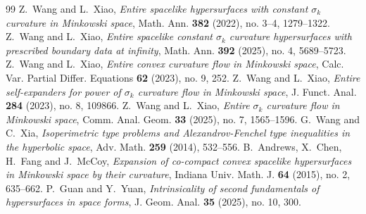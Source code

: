 \documentclass[10pt,a4paper]{amsart}
\numberwithin{equation}{section}
\begin{document}
\begin{thebibliography}{99}
 Z.~Wang and L.~Xiao, {\em Entire spacelike hypersurfaces with constant $\sigma_k$ curvature in Minkowski space}, Math. Ann. {\bf 382} (2022), no. 3--4, 1279--1322.
 Z.~Wang and L.~Xiao, {\em Entire spacelike constant $\sigma_k$ curvature hypersurfaces with prescribed boundary data at infinity}, Math. Ann. {\bf 392} (2025), no. 4, 5689--5723.
 Z.~Wang and L.~Xiao, {\em Entire convex curvature flow in Minkowski space}, Calc. Var. Partial Differ. Equations {\bf 62} (2023), no. 9, 252.
 Z.~Wang and L.~Xiao, {\em Entire self-expanders for power of $\sigma_k$ curvature flow in Minkowski space}, J. Funct. Anal. {\bf 284} (2023), no. 8, 109866.
 Z.~Wang and L.~Xiao, {\em Entire $\sigma_k$ curvature flow in Minkowski space}, Comm. Anal. Geom. {\bf 33} (2025), no. 7, 1565--1596.
 G.~Wang and C.~Xia, {\em Isoperimetric type problems and Alexandrov-Fenchel type inequalities in the hyperbolic space}, Adv. Math. {\bf 259} (2014), 532--556.
 B.~Andrews, X.~Chen, H.~Fang and J.~McCoy, {\em Expansion of co-compact convex spacelike hypersurfaces in Minkowski space by their curvature}, Indiana Univ. Math. J. {\bf 64} (2015), no. 2, 635--662.
 P.~Guan and Y.~Yuan, {\em Intrinsicality of second fundamentals of hypersurfaces in space forms}, J. Geom. Anal. {\bf 35} (2025), no. 10, 300.
\end{thebibliography}
\end{document}
